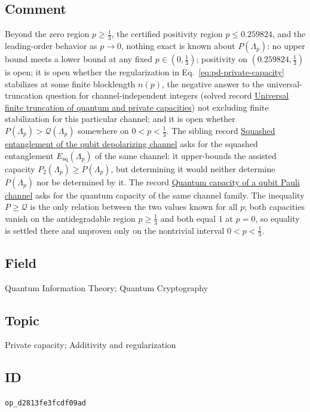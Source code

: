\subsection*{Comment}

Beyond the zero region $p\ge\tfrac{1}{3}$, the certified positivity region
$p\le0.259824$, and the leading-order behavior as $p\to0$, nothing exact is
known about $P(\Lambda_p)$: no upper bound meets a lower bound at any fixed
$p\in(0,\tfrac{1}{3})$; positivity on $(0.259824,\tfrac{1}{3})$ is open; it
is open whether the regularization in Eq.~\eqref{eq:pd-private-capacity}
stabilizes at some finite blocklength $n(p)$, the negative answer to the
universal-truncation question for channel-independent integers (solved record
\href{https://qiqc-op.com/problem/op_3ea0de34a1fe6e0b/}{Universal finite truncation of quantum and private capacities}) not excluding finite stabilization for
this particular channel; and it is open whether
$P(\Lambda_p)>\mathcal Q(\Lambda_p)$ somewhere on $0<p<\tfrac{1}{3}$.  The sibling record
\href{https://qiqc-op.com/problem/op_291a943fdec5bd1d/}{Squashed entanglement of the qubit depolarizing channel} asks for the squashed entanglement
$E_{\mathrm{sq}}(\Lambda_p)$ of the same channel: it upper-bounds the
assisted capacity $P_2(\Lambda_p)\ge P(\Lambda_p)$, but determining it would
neither determine $P(\Lambda_p)$ nor be determined by it.  The record
\href{https://qiqc-op.com/problem/op_43d4aca67bd52554/}{Quantum capacity of a qubit Pauli channel} asks for the quantum capacity of the
same channel family.  The inequality $P\ge\mathcal Q$ is the only relation
between the two values known for all $p$; both capacities vanish on the
antidegradable region $p\ge\tfrac{1}{3}$ and both equal $1$ at $p=0$, so
equality is settled there and unproven only on the nontrivial interval
$0<p<\tfrac{1}{3}$.

\subsection*{Field}

Quantum Information Theory; Quantum Cryptography

\subsection*{Topic}

Private capacity; Additivity and regularization

\subsection*{ID}

\texttt{op\_d2813fe3fcdf09ad}
